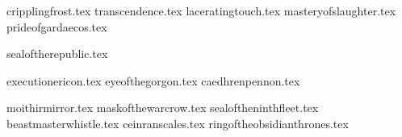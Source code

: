 
\raggedcolumns
\begin{multicols}{2}

\subtitle{\weaponenchantments}
\startsortedpricelist

{cripplingfrost.tex}
{transcendence.tex}
{laceratingtouch.tex}
{masteryofslaughter.tex}
{prideofgardaecos.tex}

\endsortedpricelist

\subtitle{\armourenchantments}
\startsortedpricelist

{sealoftherepublic.tex}

\endsortedpricelist

\subtitle{\bannerenchantments}
\startsortedpricelist

{executionericon.tex}
{eyeofthegorgon.tex}
{caedhrenpennon.tex}

\endsortedpricelist

\subtitle{\artefacts}
\startsortedpricelist

{moithirmirror.tex}
{maskofthewarcrow.tex}
{sealoftheninthfleet.tex}
{beastmasterwhistle.tex}
{ceinranscales.tex}
{ringoftheobsidianthrones.tex}

\endsortedpricelist

\end{multicols}
